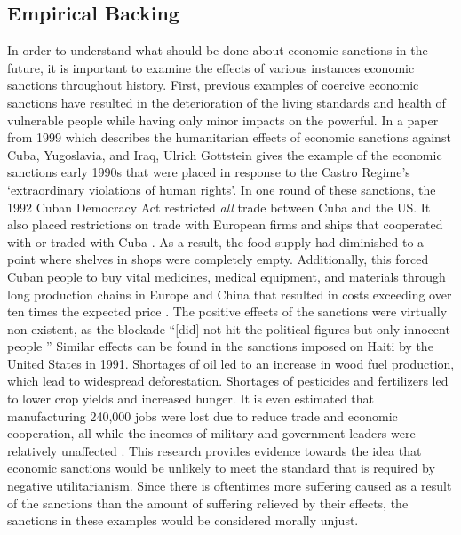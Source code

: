 \documentclass[12pt]{article}
\begin{document}
\subsection*{Empirical Backing}
In order to understand what should be done about economic sanctions in the future, it is important to examine the effects of various instances economic sanctions throughout history.
First, previous examples of coercive economic sanctions have resulted in the deterioration of the living standards and health of vulnerable people while having only minor impacts on the powerful.
In a paper from 1999 which describes the humanitarian effects of economic sanctions against Cuba, Yugoslavia, and Iraq, Ulrich Gottstein gives the example of the economic sanctions early 1990s that were placed in response to the Castro Regime’s `extraordinary violations of human rights'. 
In one round of these sanctions, the 1992 Cuban Democracy Act restricted \emph{all} trade between Cuba and the US\@.
It also placed restrictions on trade with European firms and ships that cooperated with or traded with Cuba \autocite[273]{gottstein1999}.
As a result, the food supply had diminished to a point where shelves in shops were completely empty.
Additionally, this forced Cuban people to buy vital medicines, medical equipment, and materials through long production chains in Europe and China that resulted in costs exceeding over ten times the expected price \autocite[274]{gottstein1999}.
The positive effects of the sanctions were virtually non-existent, as the blockade ``[did] not hit the political figures but only innocent people \autocite[275]{gottstein1999}''
Similar effects can be found in the sanctions imposed on Haiti by the United States in 1991.
Shortages of oil led to an increase in wood fuel production, which lead to widespread deforestation.
Shortages of pesticides and fertilizers led to lower crop yields and increased hunger.
It is even estimated that manufacturing 240,000 jobs were lost due to reduce trade and economic cooperation, all while the incomes of military and government leaders were relatively unaffected \autocite[27]{clawson1993}.
This research provides evidence towards the idea that economic sanctions would be unlikely to meet the standard that is required by negative utilitarianism.
Since there is oftentimes more suffering caused as a result of the sanctions than the amount of suffering relieved by their effects, the sanctions in these examples would be considered morally unjust.
\end{document}

